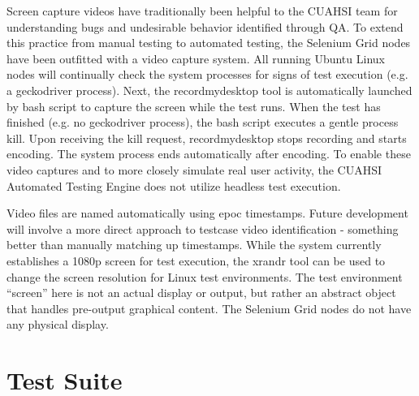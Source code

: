 \documentclass[10pt]{article}
\begin{document}
Screen capture videos have traditionally been helpful to the CUAHSI team for understanding bugs and undesirable behavior identified through QA.  To extend this practice from manual testing to automated testing, the Selenium Grid nodes have been outfitted with a video capture system.  All running Ubuntu Linux nodes will continually check the system processes for signs of test execution (e.g. a geckodriver process).  Next, the recordmydesktop tool is automatically launched by bash script to capture the screen while the test runs.  When the test has finished (e.g. no geckodriver process), the bash script executes a gentle process kill.  Upon receiving the kill request, recordmydesktop stops recording and starts encoding.  The system process ends automatically after encoding.  To enable these video captures and to more closely simulate real user activity, the CUAHSI Automated Testing Engine does not utilize headless test execution.

Video files are named automatically using epoc timestamps.  Future development will involve a more direct approach to testcase video identification - something better than manually matching up timestamps.  While the system currently establishes a 1080p screen for test execution, the xrandr tool can be used to change the screen resolution for Linux test environments.  The test environment ``screen'' here is not an actual display or output, but rather an abstract object that handles pre-output graphical content.  The Selenium Grid nodes do not have any physical display.

\section{Test Suite}
\end{document}
